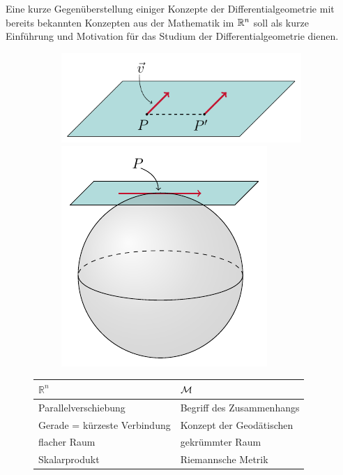 Eine kurze Gegenüberstellung einiger Konzepte der Differentialgeometrie mit bereits bekannten Konzepten aus der Mathematik im $\mathbb{R}^n$ soll als kurze Einführung und Motivation für das Studium der Differentialgeometrie dienen.
\begin{figure}[H]
\begin{figure}[H]
\includegraphics[scale=0.8]{figures/tikz/plane.pdf}
\hspace{2cm}
\includegraphics[scale=0.9]{figures/tikz/sphere_with_plane.pdf}
\end{figure}
\centering
\begin{tabular}{>{\centering}p{} | >{\centering}p{}} 
$\mathbb{R}^n$ \vspace{5pt} & $\Huge\mathcal{M}$  \vspace{5pt} \tabularnewline \hline 
\vspace{5pt} Parallelverschiebung & \vspace{5pt} Begriff des Zusammenhangs\tabularnewline 
\vspace{5pt} Gerade = kürzeste Verbindung & \vspace{5pt} Konzept der Geodätischen \tabularnewline 
\vspace{5pt} flacher Raum & \vspace{5pt} gekrümmter Raum \tabularnewline 
\vspace{5pt} Skalarprodukt & \vspace{5pt} Riemannsche Metrik \tabularnewline 
\end{tabular}
\end{figure} 

